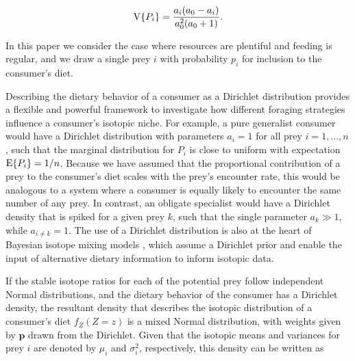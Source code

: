 \documentclass{article}
\begin{document}
\begin{equation}
  \label{eqDirVar}
  {\rm V}\{P_i\} = \frac{a_i(a_0 - a_i)}{a_0^2(a_0 + 1)}.
\end{equation}

\noindent In this paper we consider the case where resources are plentiful and feeding is regular, and we draw a single prey $i$ with probability $p_i$ for inclusion to the consumer's diet.

Describing the dietary behavior of a consumer as a Dirichlet distribution provides a flexible and powerful framework to investigate how different foraging strategies influence a consumer's isotopic niche.
For example, a pure generalist consumer would have a Dirichlet distribution with parameters $a_i = 1$ for all prey $i=1,...,n$, such that the marginal distribution for $P_i$ is close to uniform with expectation ${\rm E}\{P_i\} = 1/n$.
Because we have assumed that the proportional contribution of a prey to the consumer's diet scales with the prey's encounter rate, this would be analogous to a system where a consumer is equally likely to encounter the same number of any prey.
In contrast, an obligate specialist would have a Dirichlet density that is spiked for a given prey $k$, such that the single parameter $a_k \gg 1$, while $a_{i \neq k} = 1$.
The use of a Dirichlet distribution is also at the heart of Bayesian isotope mixing models \citep{Moore:2008kg,Parnell:2010ub,Hopkins:2012dza,Parnell:2012wv}, which assume a Dirichlet prior and enable the input of alternative dietary information to inform isotopic data.



If the stable isotope ratios for each of the potential prey follow independent Normal distributions, and the dietary behavior of the consumer has a Dirichlet density, the resultant density that describes the isotopic distribution of a consumer's diet $f_Z(Z=z)$ is a mixed Normal distribution, with weights given by $\bm p$ drawn from the Dirichlet.
Given that the isotopic means and variances for prey $i$ are denoted by $\mu_i$ and $\sigma^2_i$, respectively, this density can be written as

\end{document}
